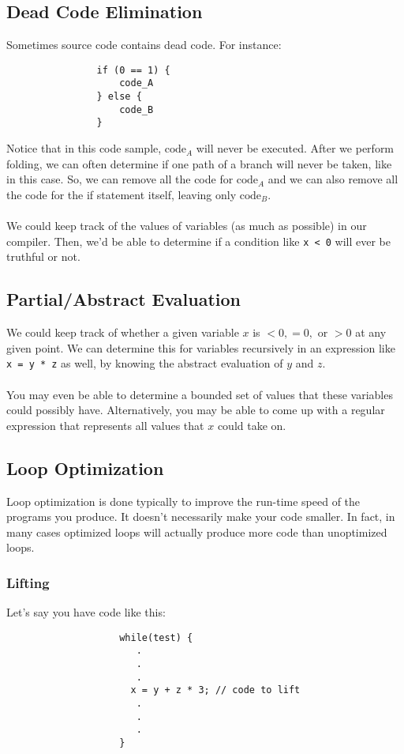 \documentclass[]{article}
\theoremstyle{definition}
\begin{document}
		\subsection{Dead Code Elimination}
			Sometimes source code contains dead code. For instance:
			\begin{verbatim}
				if (0 == 1) {
					code_A
				} else {
					code_B
				}
			\end{verbatim}
			
			Notice that in this code sample, $\text{code}_A$ will never be executed. After we perform folding, we can often determine if one path of a branch will never be taken, like in this case. So, we can remove all the code for $\text{code}_A$ and we can also remove all the code for the if statement itself, leaving only $\text{code}_B$.
			\\ \\
			We could keep track of the values of variables (as much as possible) in our compiler. Then, we'd be able to determine if a condition like \verb|x < 0| will ever be truthful or not.
			
		\subsection{Partial/Abstract Evaluation}
			We could keep track of whether a given variable $x$ is $< 0, = 0,$ or $> 0$ at any given point. We can determine this for variables recursively in an expression like \verb|x = y * z| as well, by knowing the abstract evaluation of $y$ and $z$.
			\\ \\
			You may even be able to determine a bounded set of values that these variables could possibly have. Alternatively, you may be able to come up with a regular expression that represents all values that $x$ could take on.
		
		\subsection{Loop Optimization}
			Loop optimization is done typically to improve the run-time speed of the programs you produce. It doesn't necessarily make your code smaller. In fact, in many cases optimized loops will actually produce more code than unoptimized loops.
			
			\subsubsection{Lifting}
				Let's say you have code like this:
				\begin{verbatim}
					while(test) {
					   .
					   .
					   .
					  x = y + z * 3; // code to lift
					   .
					   .
					   .
					}
				\end{verbatim}
				
\end{document}
